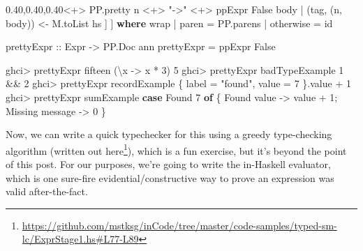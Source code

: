 \documentclass[]{article}
\newenvironment{Shaded}{}{}
\newcommand{\DataTypeTok}[1]{\textcolor[rgb]{0.56,0.13,0.00}{#1}}
\newcommand{\DecValTok}[1]{\textcolor[rgb]{0.25,0.63,0.44}{#1}}
\newcommand{\FunctionTok}[1]{\textcolor[rgb]{0.02,0.16,0.49}{#1}}
\newcommand{\KeywordTok}[1]{\textcolor[rgb]{0.00,0.44,0.13}{\textbf{#1}}}
\newcommand{\NormalTok}[1]{#1}
\newcommand{\OperatorTok}[1]{\textcolor[rgb]{0.40,0.40,0.40}{#1}}
\newcommand{\OtherTok}[1]{\textcolor[rgb]{0.00,0.44,0.13}{#1}}
\newcommand{\StringTok}[1]{\textcolor[rgb]{0.25,0.44,0.63}{#1}}
\renewcommand{\href}[2]{#2\footnote{\url{#1}}}
\begin{document}
\begin{Shaded}
\begin{Highlighting}[]
\NormalTok{            [ PP.pretty tag }\OperatorTok{\textless{}+\textgreater{}}\NormalTok{ PP.pretty n }\OperatorTok{\textless{}+\textgreater{}} \StringTok{"{-}\textgreater{}"} \OperatorTok{\textless{}+\textgreater{}}\NormalTok{ ppExpr }\DataTypeTok{False}\NormalTok{ body}
            \OperatorTok{|}\NormalTok{ (tag, (n, body)) }\OtherTok{\textless{}{-}}\NormalTok{ M.toList hs}
\NormalTok{            ]}
\NormalTok{        ]}
  \KeywordTok{where}
\NormalTok{    wrap}
      \OperatorTok{|}\NormalTok{ paren }\OtherTok{=}\NormalTok{ PP.parens}
      \OperatorTok{|} \FunctionTok{otherwise} \OtherTok{=} \FunctionTok{id}

\OtherTok{prettyExpr ::} \DataTypeTok{Expr} \OtherTok{{-}\textgreater{}} \DataTypeTok{PP.Doc}\NormalTok{ ann}
\NormalTok{prettyExpr }\OtherTok{=}\NormalTok{ ppExpr }\DataTypeTok{False}
\end{Highlighting}
\end{Shaded}

\begin{Shaded}
\begin{Highlighting}[]
\NormalTok{ghci}\OperatorTok{\textgreater{}}\NormalTok{ prettyExpr fifteen}
\NormalTok{(\textbackslash{}x }\OtherTok{{-}\textgreater{}}\NormalTok{ x }\OperatorTok{*} \DecValTok{3}\NormalTok{) }\DecValTok{5}
\NormalTok{ghci}\OperatorTok{\textgreater{}}\NormalTok{ prettyExpr badTypeExample}
\DecValTok{1} \OperatorTok{\&\&} \DecValTok{2}
\NormalTok{ghci}\OperatorTok{\textgreater{}}\NormalTok{ prettyExpr recordExample}
\NormalTok{\{ label }\OtherTok{=} \StringTok{"found"}\NormalTok{, value }\OtherTok{=} \DecValTok{7}\NormalTok{ \}}\OperatorTok{.}\NormalTok{value }\OperatorTok{+} \DecValTok{1}
\NormalTok{ghci}\OperatorTok{\textgreater{}}\NormalTok{ prettyExpr sumExample}
\KeywordTok{case} \DataTypeTok{Found} \DecValTok{7} \KeywordTok{of}\NormalTok{ \{ }\DataTypeTok{Found}\NormalTok{ value }\OtherTok{{-}\textgreater{}}\NormalTok{ value }\OperatorTok{+} \DecValTok{1}\NormalTok{; }\DataTypeTok{Missing}\NormalTok{ message }\OtherTok{{-}\textgreater{}} \DecValTok{0}\NormalTok{ \}}
\end{Highlighting}
\end{Shaded}

Now, we can write a quick typechecker for this using a greedy type-checking
algorithm
(\href{https://github.com/mstksg/inCode/tree/master/code-samples/typed-sm-lc/ExprStage1.hs\#L77-L89}{written
out here}), which is a fun exercise, but it's beyond the point of this post. For
our purposes, we're going to write the in-Haskell evaluator, which is one
sure-fire evidential/constructive way to prove an expression was valid
after-the-fact.
\end{document}
